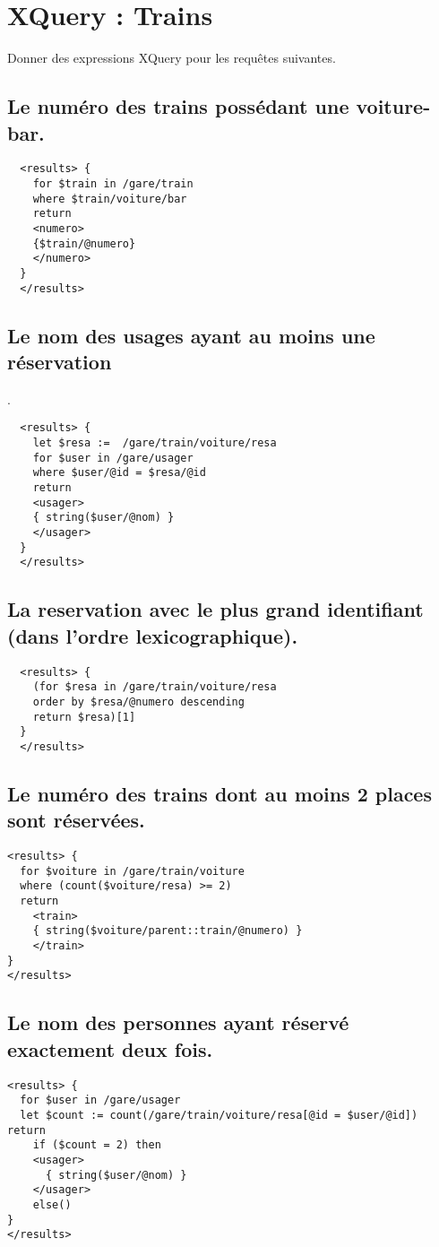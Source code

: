 \chapter{XQuery : Trains}
Donner des expressions XQuery pour les requêtes suivantes.

\section{Le numéro des trains possédant une voiture-bar.}
\begin{verbatim}
  <results> {
    for $train in /gare/train
    where $train/voiture/bar
    return
    <numero>
    {$train/@numero}
    </numero>
  }
  </results>
\end{verbatim}

\section{Le nom des usages ayant au moins une réservation}.
\begin{verbatim}
  <results> {
    let $resa :=  /gare/train/voiture/resa
    for $user in /gare/usager
    where $user/@id = $resa/@id
    return
    <usager>
    { string($user/@nom) }
    </usager>
  }
  </results>
\end{verbatim}

\section{La reservation avec le plus grand identifiant (dans l’ordre lexicographique).}
\begin{verbatim}
  <results> {
    (for $resa in /gare/train/voiture/resa
    order by $resa/@numero descending
    return $resa)[1]
  }
  </results>
\end{verbatim}

\section{Le numéro des trains dont au moins 2 places sont réservées.}
\begin{verbatim}
<results> {
  for $voiture in /gare/train/voiture
  where (count($voiture/resa) >= 2)
  return
    <train>
    { string($voiture/parent::train/@numero) }
    </train>
}
</results>
\end{verbatim}

\section{Le nom des personnes ayant réservé exactement deux fois.}
\begin{verbatim}
<results> {
  for $user in /gare/usager
  let $count := count(/gare/train/voiture/resa[@id = $user/@id]) return
    if ($count = 2) then
    <usager>
      { string($user/@nom) }
    </usager>
    else()
}
</results>
\end{verbatim}

